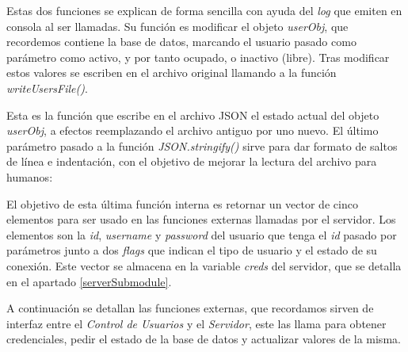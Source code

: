 Estas dos funciones se explican de forma sencilla con ayuda del \emph{log} que emiten en consola al ser llamadas. Su función es modificar el objeto \emph{userObj}, que recordemos contiene la base de datos, marcando el usuario pasado como parámetro como activo, y por tanto ocupado, o inactivo (libre). Tras modificar estos valores se escriben en el archivo original llamando a la función \emph{writeUsersFile()}.


Esta es la función que escribe en el archivo JSON el estado actual del objeto \emph{userObj}, a efectos reemplazando el archivo antiguo por uno nuevo. El último parámetro pasado a la función \emph{JSON.stringify()} sirve para dar formato de saltos de línea e indentación, con el objetivo de mejorar la lectura del archivo para humanos:

\begin{listing}[H]
\begin{minted}
[
frame=lines,
framesep=2mm,
baselinestretch=1.2,
bgcolor=lightgray,
fontsize=\footnotesize,
breaklines=true,
breaksymbolleft={}
]
{javascript}
function prepareToConnect(userId) {
   return [userObj.users[userId].id, userObj.users[userId].username, userObj.users[userId].password, false, 0];
\end{verbatim}
\caption{Preparación de credenciales.}
\end{listing}

El objetivo de esta última función interna es retornar un vector de cinco elementos para ser usado en las funciones externas llamadas por el servidor. Los elementos son la \emph{id}, \emph{username} y \emph{password} del usuario que tenga el \emph{id} pasado por parámetros junto a dos \emph{flags} que indican el tipo de usuario y el estado de su conexión. Este vector se almacena en la variable \emph{creds} del servidor, que se detalla en el apartado \ref{serverSubmodule}.

A continuación se detallan las funciones externas, que recordamos sirven de interfaz entre el \emph{Control de Usuarios} y el \emph{Servidor}, este las llama para obtener credenciales, pedir el estado de la base de datos y actualizar valores de la misma.

